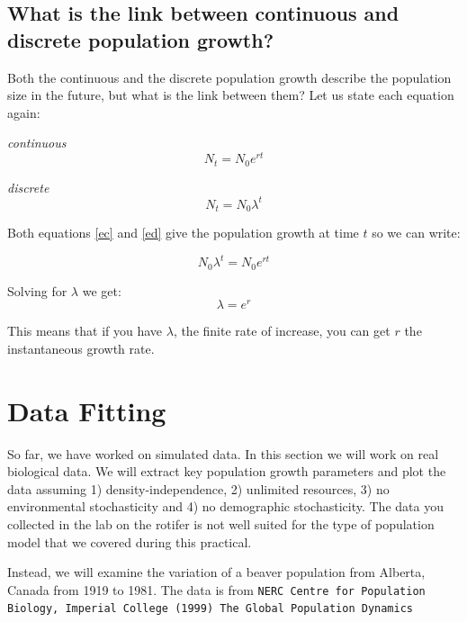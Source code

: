\documentclass{article}\usepackage[]{graphicx}\usepackage[]{color}
\begin{document}
\subsection{What is the link between continuous and discrete population growth?}
Both the continuous and the discrete population growth describe the population size in the future, but what is the link between them?
Let us state each equation again:

\textit{continuous}
\begin{equation}
N_t=N_0e^{rt}\label{ec}
\end{equation}


\textit{discrete}
\begin{equation}
N_t=N_0\lambda^t \label{ed}
\end{equation}


Both equations \ref{ec} and \ref{ed} give the population growth at time $t$ so we can write:


\begin{equation}
N_0\lambda^t =N_0e^{rt}
\end{equation}

Solving for $\lambda$ we get:
\begin{equation}
\lambda =e^{r}
\end{equation}

This means that if you have $\lambda$, the finite rate of increase, you can get $r$ the instantaneous growth rate.

\section{Data Fitting}
So far, we have worked on simulated data. In this section we will work on real biological data. We will extract key population growth parameters and plot the data assuming 1) density-independence, 2) unlimited resources, 3) no environmental stochasticity and 4) no demographic stochasticity. The data you collected in the lab on the rotifer is not well suited for the type of population model that we covered during this practical.


Instead, we will examine the variation of a beaver population from Alberta, Canada from 1919 to 1981. The data is from \texttt{NERC Centre for Population Biology, Imperial College (1999) The Global Population Dynamics} 
\end{document}
